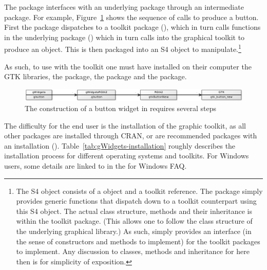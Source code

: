 The  package interfaces with an underlying \R\/ package
through an intermediate package. For example,
Figure~\ref{fig:gWidgets-yuml} shows the sequence of calls to produce
a button. First the  package dispatches to a toolkit
package (), which in turn calls functions in the
underlying \R\/ package () which in turn calls into the
graphical toolkit to produce an object. This is then packaged into an
S4 object to manipulate.\footnote{The S4 object consists of a
   object and a toolkit reference. The 
  package simply provides generic functions that dispatch down to a
  toolkit counterpart using this S4 object. The actual class
  structure, methods and their inheritance is within the toolkit
  package. (This allows one to follow the class structure of the
  underlying graphical library.) As such,  simply
  provides an interface (in the sense of constructors and methods to
  implement) for the toolkit packages to implement. Any discussion to
  classes, methods and inheritance for  here then is for
  simplicity of exposition.}

As such, to use  with the \GTK\/ toolkit one must have
installed on their computer the GTK\/ libraries, the 
package, the  package and the 
package.


\begin{figure}
  \centering
  \includegraphics[width=.95\textwidth]{fig-gWidgets-yuml}
  \caption{The construction of a button widget in 
    requires several steps}
  \label{fig:gWidgets-yuml}
\end{figure}


The difficulty for the end user is the installation of the graphic
toolkit, as all other packages are installed through CRAN, or are
recommended packages with an \R\/ installation
(). Table~\ref{tab:gWidgets-installation} roughly describes
the installation process for different operating systems and
toolkits. For Windows users, some details are linked to in the \R{}
for Windows FAQ.


